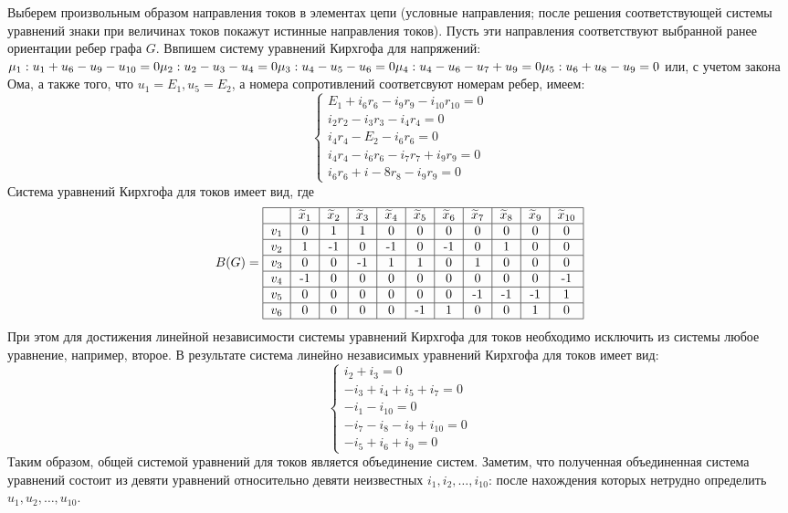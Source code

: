 \documentclass[12pt, letterpaper, titlepage]{article}
\begin{document}
Выберем произвольным образом направления токов в элементах цепи (условные
направления; после решения соответствующей системы уравнений знаки при величинах
токов покажут истинные направления токов). Пусть эти направления соответствуют
выбранной ранее ориентации ребер графа $G$. Ввпишем систему уравнений Кирхгофа для напряжений:\\
$
\mu_1: u_1+u_6-u_9-u_{10}=0\\
\mu_2: u_2-u_3-u_4=0\\
\mu_3: u_4-u_5-u_6=0\\
\mu_4: u_4-u_6-u_7+u_9=0\\
\mu_5: u_6+u_8-u_9=0\\
$
или, с учетом закона Ома, а также того, что $u_1=E_1, u_5=E_2$, а номера сопротивлений соответсвуют номерам ребер, имеем:
\[
    \begin{cases}
    E_1+i_6r_6-i_9r_9-i_{10}r_{10}=0\\
    i_2r_2-i_3r_3-i_4r_4=0\\
    i_4r_4-E_2-i_6r_6=0\\
    i_4r_4-i_6r_6-i_7r_7+i_9r_9=0\\
    i_6r_6+i-8r_8-i_9r_9=0
    \end{cases}
\]
Система уравнений Кирхгофа для токов имеет вид, где
\[
B(G)=
\begin{tabular}{|c|c|c|c|c|c|c|c|c|c|c|}
    \hline
    & $\widetilde x_1$ & $\widetilde x_2$ & $\widetilde x_3$ & $\widetilde x_4$ & $\widetilde x_5$ & $\widetilde x_6$ & $\widetilde x_7$ & $\widetilde x_8$ & $\widetilde x_9$ & $\widetilde x_{10}$\\
    \hline
    $v_1$ & 0 & 1 & 1 & 0 & 0 & 0 & 0 & 0 & 0 & 0 \\
    \hline
    $v_2$ & 1 & -1 & 0 & -1 & 0 & -1 & 0 & 1& 0& 0\\
    \hline
    $v_3$ & 0 & 0 & -1 & 1 & 1 & 0 & 1& 0& 0& 0 \\
    \hline
    $v_4$ & -1 & 0 & 0 & 0 & 0 & 0 & 0 & 0 & 0 & -1 \\
    \hline
    $v_5$ & 0 & 0 & 0 & 0 & 0 & 0 & -1 & -1 & -1 & 1 \\
    \hline
    $v_6$ & 0 & 0 & 0 & 0 & -1 & 1 & 0 &0& 1& 0 \\
    \hline
\end{tabular}
\]
При этом для достижения линейной независимости системы уравнений Кирхгофа
для токов необходимо исключить из системы любое уравнение, например, второе. В
результате система линейно независимых уравнений Кирхгофа для токов имеет вид:
\[
    \begin{cases}
        i_2+i_3=0\\
        -i_3+i_4+i_5+i_7=0\\
        -i_1-i_{10}=0\\
        -i_7-i_8-i_9+i_{10}=0\\
        -i_5+i_6+i_9=0
    \end{cases}
\]
Таким образом, общей системой уравнений для токов является объединение систем. Заметим, что полученная объединенная система уравнений состоит из девяти
уравнений относительно девяти неизвестных $i_1,i_2,\dots,i_{10}$: после нахождения которых
нетрудно определить $u_1,u_2,\dots,u_{10}$.
\end{document}
